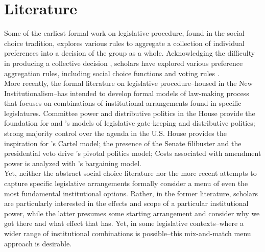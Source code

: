 \documentclass[12pt]{article}
\theoremstyle{plain}		      \newtheorem{assn}{Assumption}
\theoremstyle{plain}		      \newtheorem{prop}{Proposition}
\theoremstyle{plain}		      \newtheorem{lemma}{Lemma}
\theoremstyle{plain}	          \newtheorem{imp}{Implication}
\theoremstyle{plain}	          \newtheorem{hyp}{Hypothesis}
\theoremstyle{definition}		  \newtheorem{defn}{Definition}
\theoremstyle{remark}	          \newtheorem{rem}{Remark}
\theoremstyle{definition}         \newtheorem{case}{Case}
\begin{document}
\section{Literature}
\indent Some of the earliest formal work on legislative procedure, found in the social choice tradition, explores various rules to aggregate a collection of individual preferences into a decision of the group as a whole. Acknowledging the difficulty in producing a collective decision \citep{condorcet1785, arrow50, banks95, mckelvey76}, scholars have explored various preference aggregation rules, including social choice functions  \citep{sen70, fishburn73, riker82} and voting rules \citep{black58, mckelvey76, mckelvey79, straffin80, nurmi87, saari94}. 
\\
\indent More recently, the formal literature on legislative procedure--housed in the New Institutionalism--has intended to develop formal models of law-making process that focuses on combinations of institutional arrangements found in specific legislatures. Committee power and distributive politics in the House provide the foundation for \citet{shepsleweingast87} and \citet{weingastmarshall88}'s models of legislative gate-keeping and distributive politics; strong majority control over the agenda in the U.S. House provides the inspiration for \citet{coxmccubbins05}'s Cartel model; the presence of the Senate filibuster and the presidential veto drive \citet{krehbiel99}'s pivotal politics model; Costs associated with amendment power is analyzed with \citet{hartogmonroe11}'s bargaining model. 
\\
\indent Yet, neither the abstract social choice literature nor the more recent attempts to capture specific legislative arrangements formally consider a menu of even the most fundamental institutional options. Rather, in the former literature, scholars are particularly interested in the effects and scope of a particular institutional power, while the latter presumes some starting arrangement and consider why we got there and what effect that has. Yet, in some legislative contexts--where a wider range of institutional combinations is possible--this mix-and-match menu approach is desirable.
 
\end{document}
